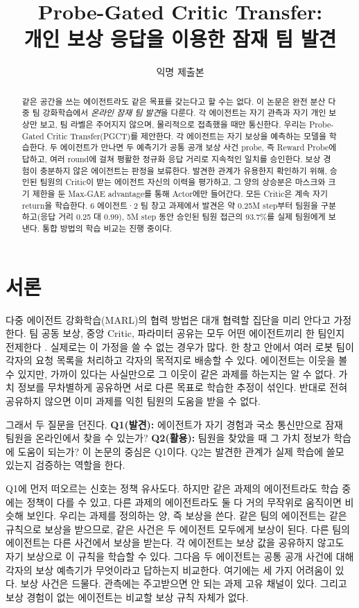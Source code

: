 \documentclass[10pt,twocolumn,letterpaper]{article}
\title{Probe-Gated Critic Transfer:\\개인 보상 응답을 이용한 잠재 팀 발견}
\author{익명 제출본}
\date{}
\begin{document}
\maketitle

\begin{abstract}
같은 공간을 쓰는 에이전트라도 같은 목표를 갖는다고 할 수는 없다. 이 논문은 완전 분산 다중 팀 강화학습에서 \emph{온라인 잠재 팀 발견}을 다룬다. 각 에이전트는 자기 관측과 자기 개인 보상만 보고, 팀 라벨은 주어지지 않으며, 물리적으로 접촉했을 때만 통신한다. 우리는 Probe-Gated Critic Transfer(PGCT)를 제안한다. 각 에이전트는 자기 보상을 예측하는 모델을 학습한다. 두 에이전트가 만나면 두 예측기가 공통 공개 보상 사건 probe, 즉 Reward Probe에 답하고, 여러 round에 걸쳐 평활한 정규화 응답 거리로 지속적인 일치를 승인한다. 보상 경험이 충분하지 않은 에이전트는 판정을 보류한다. 발견한 관계가 유용한지 확인하기 위해, 승인된 팀원의 Critic이 받는 에이전트 자신의 이력을 평가하고, 그 양의 상승분은 마스크와 크기 제한을 둔 Max-GAE advantage를 통해 Actor에만 들어간다. 모든 Critic은 계속 자기 return을 학습한다. 6 에이전트·2 팀 창고 과제에서 발견은 약 0.25M step부터 팀원을 구분하고(응답 거리 0.25 대 0.99), 5M step 동안 승인된 팀원 접근의 93.7\%를 실제 팀원에게 보낸다. 통합 방법의 학습 비교는 진행 중이다.
\end{abstract}

\section{서론}
다중 에이전트 강화학습(MARL)의 협력 방법은 대개 협력할 집단을 미리 안다고 가정한다. 팀 공동 보상, 중앙 Critic, 파라미터 공유는 모두 어떤 에이전트끼리 한 팀인지 전제한다 \citep{mappo,seps}. 실제로는 이 가정을 쓸 수 없는 경우가 많다. 한 창고 안에서 여러 로봇 팀이 각자의 요청 목록을 처리하고 각자의 목적지로 배송할 수 있다. 에이전트는 이웃을 볼 수 있지만, 가까이 있다는 사실만으로 그 이웃이 같은 과제를 하는지는 알 수 없다. 가치 정보를 무차별하게 공유하면 서로 다른 목표로 학습한 추정이 섞인다. 반대로 전혀 공유하지 않으면 이미 과제를 익힌 팀원의 도움을 받을 수 없다.

그래서 두 질문을 던진다. \textbf{Q1(발견):} 에이전트가 자기 경험과 국소 통신만으로 잠재 팀원을 온라인에서 찾을 수 있는가? \textbf{Q2(활용):} 팀원을 찾았을 때 그 가치 정보가 학습에 도움이 되는가? 이 논문의 중심은 Q1이다. Q2는 발견한 관계가 실제 학습에 쓸모 있는지 검증하는 역할을 한다.

Q1에 먼저 떠오르는 신호는 정책 유사도다. 하지만 같은 과제의 에이전트라도 학습 중에는 정책이 다를 수 있고, 다른 과제의 에이전트라도 둘 다 거의 무작위로 움직이면 비슷해 보인다. 우리는 과제를 정의하는 양, 즉 보상을 쓴다. 같은 팀의 에이전트는 같은 규칙으로 보상을 받으므로, 같은 사건은 두 에이전트 모두에게 보상이 된다. 다른 팀의 에이전트는 다른 사건에서 보상을 받는다. 각 에이전트는 보상 값을 공유하지 않고도 자기 보상으로 이 규칙을 학습할 수 있다. 그다음 두 에이전트는 공통 공개 사건에 대해 각자의 보상 예측기가 무엇이라고 답하는지 비교한다. 여기에는 세 가지 어려움이 있다. 보상 사건은 드물다. 관측에는 주고받으면 안 되는 과제 고유 채널이 있다. 그리고 보상 경험이 없는 에이전트는 비교할 보상 규칙 자체가 없다.
\end{document}
